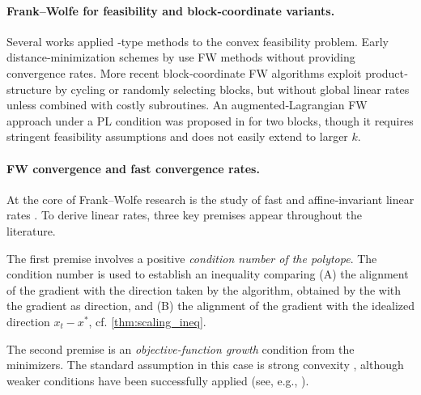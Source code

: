\documentclass[twoside]{article}
\begin{document}
\paragraph{Frank–Wolfe for feasibility and block‐coordinate variants.}  
Several works applied \FW{}‐type methods to the convex feasibility problem. Early distance‐minimization schemes by \citep{Wil68,Wol76} use FW methods without providing convergence rates. More recent block‐coordinate FW algorithms \citep{BPS15,BRZ23} exploit product‐structure by cycling or randomly selecting blocks, but without global linear rates unless combined with costly subroutines.
An augmented‐Lagrangian FW approach under a PL condition was proposed in \citep{GPL18} for two blocks, though it requires stringent feasibility assumptions and does not easily extend to larger $k$.

\paragraph{FW convergence and fast convergence rates.}  
At the core of Frank–Wolfe research is the study of fast \citep{garber2015faster,KDP20,wirth2023acceleration,wirth2025accelerated} and affine‐invariant linear rates \citep{LJ15,TTP22,pena2023affine,wirth2024fast}. To derive linear rates, three key premises \citep{PR18} appear throughout the literature.

The first premise involves a positive \emph{condition number of the polytope}.
The condition number is used to establish an inequality comparing (A) the alignment of the gradient with the direction taken by the algorithm, obtained by the \LMO{} with the gradient as direction, and (B) the alignment of the gradient with the idealized direction $x_t - x^\ast$, cf. \cref{thm:scaling_ineq}. 
%

The second premise is an \emph{objective-function growth} condition from the minimizers.
The standard assumption in this case is strong convexity \citep{GM86,LJ15,GH15,TTP22}, although weaker conditions have been successfully applied (see, e.g., \citep{BS15,LJ15,wirth2024fast}).
\end{document}
